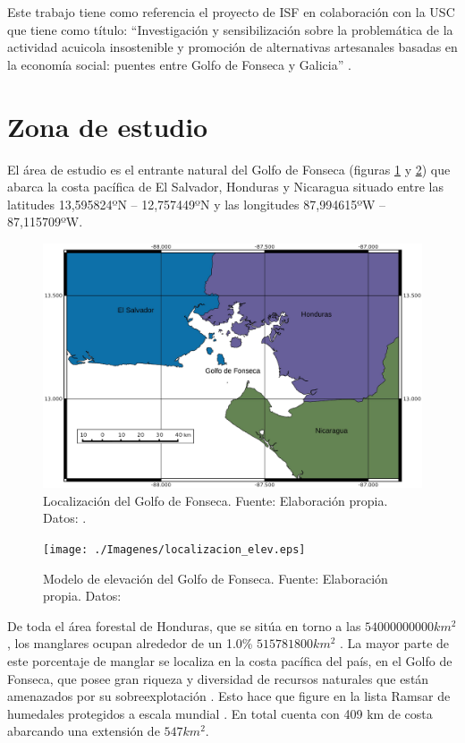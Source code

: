 Este trabajo tiene como referencia el proyecto de \ac{ISF} en colaboración con la \ac{USC} que tiene como título: ``Investigación y sensibilización sobre la problemática de la actividad acuicola insostenible y promoción de alternativas artesanales basadas en la economía social: puentes entre Golfo de Fonseca y Galicia'' \citep{laborate2014}.

\section{Zona de estudio}
\label{sec:zonaestudio}
El área de estudio es el entrante natural del Golfo de Fonseca (figuras \ref{fig:localizacion} y \ref{fig:elevacion}) que abarca la costa pacífica de El Salvador, Honduras y Nicaragua situado entre las latitudes 13,595824ºN – 12,757449ºN y las longitudes 87,994615ºW – 87,115709ºW.\Sep

\begin{figure}
	\centering
	\includegraphics[width=0.8\linewidth]{./Imagenes/localizacion.eps}
	\caption[Localización del Golfo de Fonseca]{Localización del Golfo de Fonseca. Fuente: Elaboración propia. Datos: \cite{GADM2012}.}
	\label{fig:localizacion}
\end{figure}

\begin{figure}
	\centering
	\texttt{[image: ./Imagenes/localizacion\_elev.eps]}
	\caption[Modelo de elevación del Golfo de Fonseca]{Modelo de elevación del Golfo de Fonseca. Fuente: Elaboración propia. Datos: \cite{SRTM2008}}
	\label{fig:elevacion}
\end{figure}

De toda el área forestal de Honduras, que se sitúa en torno a las $54000000000 km^{2}$, los manglares ocupan alrededor de un 1.0\% $515781800 km^{2}$ \citep{anuario2013}. La mayor parte de este porcentaje de manglar se localiza en la costa pacífica del país, en el Golfo de Fonseca, que posee gran riqueza y diversidad de recursos naturales que están amenazados por su sobreexplotación \citep{Jimenez1994}. Esto hace que figure en la lista Ramsar de humedales protegidos a escala mundial \citep{Ramsar2014}. En total cuenta con 409 km de costa abarcando una extensión de $547 km^{2}$.\Sep

